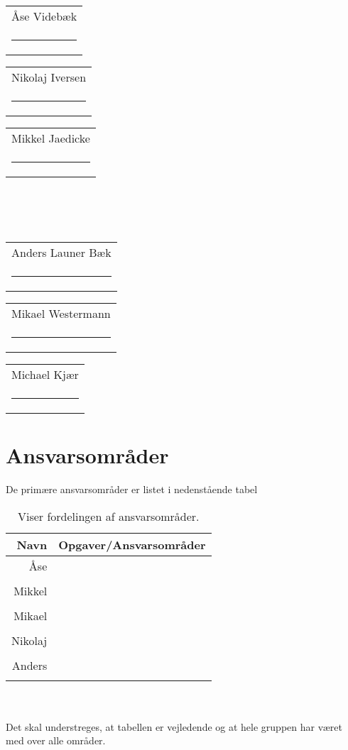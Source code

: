 




\vspace{3cm}
{
\newcommand{\namesigdate}[2][5cm]{%
  \begin{tabular}{@{}p{#1}@{}}
    #2 \\[2\normalbaselineskip] \hrule \\[0pt]
  \end{tabular}
}
\begin{changemargin}{-1cm}{-1cm}
\centering
\noindent \namesigdate{Åse Videbæk} \hspace{1cm} \namesigdate{Nikolaj Iversen} \hspace{1cm} \namesigdate{Mikkel Jaedicke} \\~\\~\\
\centering
\noindent \namesigdate{Anders Launer Bæk} \hspace{1cm}  \namesigdate{Mikael Westermann} \hspace{1cm}   \namesigdate{Michael Kjær}
\end{changemargin}
}
\bigskip
\section*{Ansvarsområder}
De primære ansvarsområder er listet i nedenstående tabel
\bigskip
\begin{table}[!th]
\centering
\setlength{\extrarowheight}{5pt}
 \begin{tabular}{r|l}
Navn&Opgaver/Ansvarsområder \\[6pt] \hline
Åse&\\
&\\[6pt] \hline
Mikkel&\\ 
&\\[6pt] \hline
Mikael&\\
&\\[6pt] \hline
Nikolaj&\\
&\\[6pt] \hline
Anders&\\
&\\
\end{tabular}     
\caption*{Viser fordelingen af ansvarsområder.}            
\end{table}\\~\\ 
Det skal understreges, at tabellen er vejledende og at hele gruppen har været med over alle områder.
